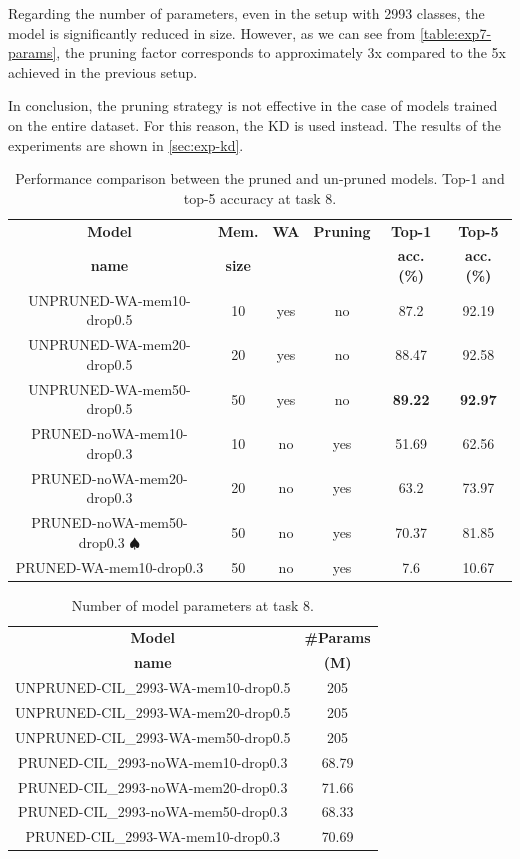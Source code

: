 Regarding the number of parameters, even in the setup with 2993 classes, the model is significantly reduced in size.
However, as we can see from \autoref{table:exp7-params}, the pruning factor corresponds to approximately 3x compared to the 5x achieved in the previous setup.

In conclusion, the pruning strategy is not effective in the case of models trained on the entire dataset.
For this reason, the KD is used instead. The results of the experiments are shown in \autoref{sec:exp-kd}.

\begin{table}[H]
    \centering
    \begin{tabular}{c|c|c|c|c|c}
        \hline
        \textbf{Model} &
        \textbf{Mem.} &
        \textbf{WA} &
        \textbf{Pruning} &
        \textbf{Top-1} & 
        \textbf{Top-5} \\
        \textbf{name} &
        \textbf{size} &
        &
        &
        \textbf{acc. (\%)} & 
        \textbf{acc. (\%)} \\
        \hline
        \hline
UNPRUNED-WA-mem10-drop0.5&10&yes&no&87.2&92.19\\
UNPRUNED-WA-mem20-drop0.5&20&yes&no&88.47&92.58\\
UNPRUNED-WA-mem50-drop0.5&50&yes&no&\textbf{89.22}&\textbf{92.97}\\
\hline
PRUNED-noWA-mem10-drop0.3&10&no&yes&51.69&62.56\\
PRUNED-noWA-mem20-drop0.3&20&no&yes&63.2&73.97\\
PRUNED-noWA-mem50-drop0.3 $\spadesuit$&50&no&yes&70.37&81.85\\
\hline
PRUNED-WA-mem10-drop0.3&50&no&yes&7.6&10.67\\
\hline
\end{tabular}
\caption{Performance comparison between the pruned and un-pruned models. Top-1 and top-5 accuracy at task 8.}
    \label{table:exp7}
\end{table}


\begin{table}[H]
    \centering
    \begin{tabular}{c|c}
        \hline
        \textbf{Model} &
        \textbf{\#Params} \\
        \textbf{name} &
        \textbf{(M)} \\
        \hline
        \hline
UNPRUNED-CIL\_2993-WA-mem10-drop0.5&205\\
UNPRUNED-CIL\_2993-WA-mem20-drop0.5&205\\
UNPRUNED-CIL\_2993-WA-mem50-drop0.5&205\\
\hline
PRUNED-CIL\_2993-noWA-mem10-drop0.3&68.79\\
PRUNED-CIL\_2993-noWA-mem20-drop0.3&71.66\\
PRUNED-CIL\_2993-noWA-mem50-drop0.3&68.33\\
\hline
PRUNED-CIL\_2993-WA-mem10-drop0.3&70.69\\
        \hline
    \end{tabular}
	\caption{Number of model parameters at task 8.}%
    \label{table:exp7-params}
\end{table}

